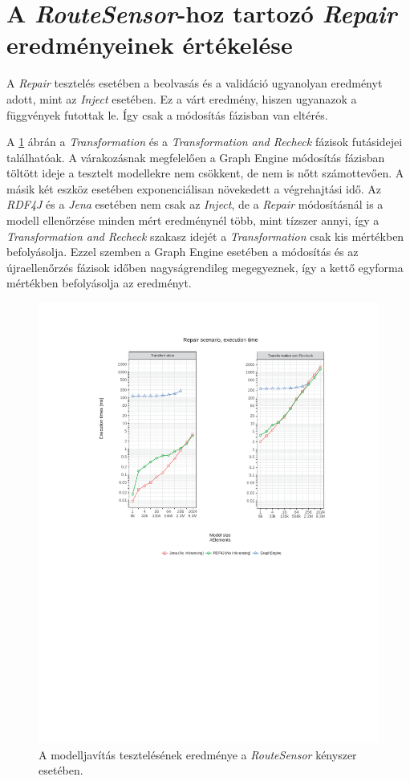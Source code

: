 \section{A \emph{RouteSensor}-hoz tartozó \emph{Repair} eredményeinek értékelése}

A \emph{Repair} tesztelés esetében a beolvasás és a validáció ugyanolyan eredményt adott, mint az \emph{Inject} esetében. Ez a várt eredmény, hiszen ugyanazok a függvények futottak le. Így csak a módosítás fázisban van eltérés.

A \ref{fig:RouteSensorRepairResultTransformation} ábrán a \emph{Transformation} és a \emph{Transformation and Recheck} fázisok futásidejei találhatóak. A várakozásnak megfelelően a Graph Engine módosítás fázisban töltött ideje a tesztelt modellekre nem csökkent, de nem is nőtt számottevően. A másik két eszköz esetében exponenciálisan növekedett a végrehajtási idő. Az \emph{RDF4J} és a \emph{Jena} esetében nem csak az \emph{Inject}, de a \emph{Repair} módosításnál is a modell ellenőrzése minden mért eredménynél több, mint tízszer annyi, így a \emph{Transformation and Recheck} szakasz idejét a \emph{Transformation} csak kis mértékben befolyásolja. Ezzel szemben a Graph Engine esetében a módosítás és az újraellenőrzés fázisok időben nagyságrendileg megegyeznek, így a kettő egyforma mértékben befolyásolja az eredményt.

\begin{figure}[H]
	\centering
	\includegraphics{figures/RouteSensor-times-Repair-Transformation-Recheck.pdf}
	\caption{A modelljavítás tesztelésének eredménye a \emph{RouteSensor} kényszer esetében.}
	\label{fig:RouteSensorRepairResultTransformation}
\end{figure}

